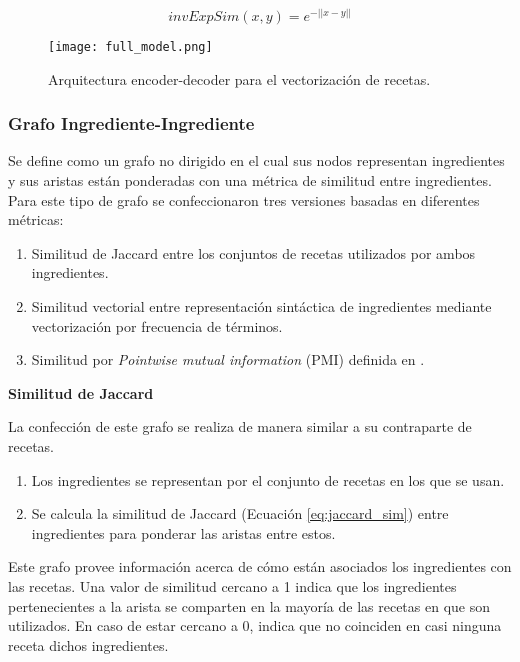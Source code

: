 \documentclass[
	a4paper, %
	10pt, %
	unnumberedsections, %
	twoside, %
]{LTJournalArticle}
\begin{document}
\begin{equation}
	invExpSim(x, y) = e^{-||x-y||}
	\label{eq:inverse_exp_sim}
\end{equation}

\begin{figure}
	\texttt{[image: full\_model.png]}
	\caption{Arquitectura encoder-decoder para el vectorización de recetas.}
	\label{fig:encoder_decoder_small}
\end{figure}

\subsubsection{Grafo Ingrediente-Ingrediente}

Se define como un grafo no dirigido en el cual sus nodos representan ingredientes y sus aristas
están ponderadas con una métrica de similitud entre ingredientes. 
Para este tipo de grafo se confeccionaron tres versiones basadas en diferentes métricas:

\begin{enumerate}
	\item Similitud de Jaccard entre los conjuntos de recetas utilizados por ambos ingredientes.
	\item Similitud vectorial entre representación sintáctica de ingredientes mediante vectorización 
	por frecuencia de términos.
	\item Similitud por \textit{Pointwise mutual information} (PMI) definida en \textcite{teng2012recipe}.
\end{enumerate}

\textbf{Similitud de Jaccard}

La confección de este grafo se realiza de manera similar a su contraparte de recetas.

\begin{enumerate}
	\item Los ingredientes se representan por el conjunto de recetas en los que se usan.
	\item Se calcula la similitud de Jaccard (Ecuación \ref{eq:jaccard_sim}) entre ingredientes para ponderar las aristas
	entre estos.
\end{enumerate}

Este grafo provee información acerca de cómo están asociados los ingredientes con las recetas. Una valor de similitud
cercano a 1 indica que los ingredientes pertenecientes a la arista se comparten en la mayoría de las recetas en que son
utilizados. En caso de estar cercano a 0, indica que no coinciden en casi ninguna receta dichos ingredientes.
\end{document}
